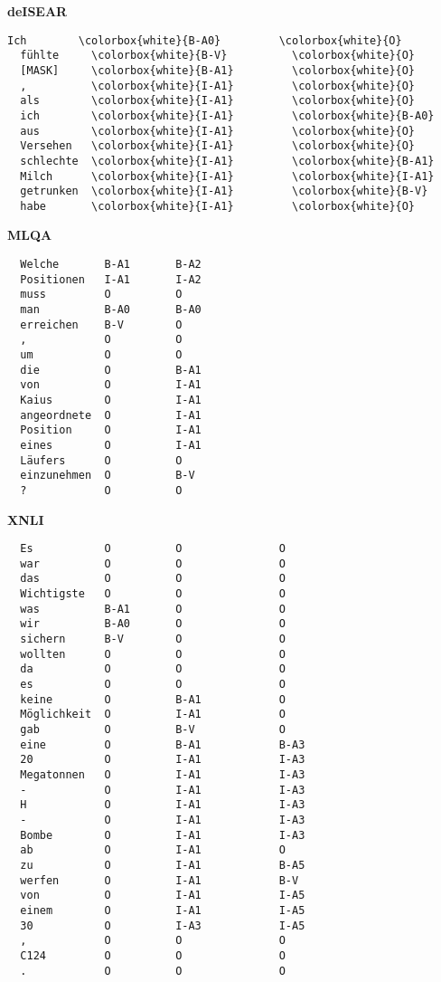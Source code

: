 \textbf{deISEAR}

\begin{Verbatim}[commandchars=\\\{\}]
  Ich        \colorbox{white}{B-A0}         \colorbox{white}{O}
  fühlte     \colorbox{white}{B-V}          \colorbox{white}{O}
  [MASK]     \colorbox{white}{B-A1}         \colorbox{white}{O}
  ,          \colorbox{white}{I-A1}         \colorbox{white}{O}
  als        \colorbox{white}{I-A1}         \colorbox{white}{O}
  ich        \colorbox{white}{I-A1}         \colorbox{white}{B-A0}
  aus        \colorbox{white}{I-A1}         \colorbox{white}{O}
  Versehen   \colorbox{white}{I-A1}         \colorbox{white}{O}
  schlechte  \colorbox{white}{I-A1}         \colorbox{white}{B-A1}
  Milch      \colorbox{white}{I-A1}         \colorbox{white}{I-A1}
  getrunken  \colorbox{white}{I-A1}         \colorbox{white}{B-V}
  habe       \colorbox{white}{I-A1}         \colorbox{white}{O}
\end{Verbatim}

\textbf{MLQA}

\begin{verbatim}
  Welche       B-A1       B-A2
  Positionen   I-A1       I-A2
  muss         O          O
  man          B-A0       B-A0
  erreichen    B-V        O
  ,            O          O
  um           O          O
  die          O          B-A1
  von          O          I-A1
  Kaius        O          I-A1
  angeordnete  O          I-A1
  Position     O          I-A1
  eines        O          I-A1
  Läufers      O          O
  einzunehmen  O          B-V
  ?            O          O
\end{verbatim}

\textbf{XNLI}

\begin{verbatim}
  Es           O          O               O
  war          O          O               O
  das          O          O               O
  Wichtigste   O          O               O
  was          B-A1       O               O
  wir          B-A0       O               O
  sichern      B-V        O               O
  wollten      O          O               O
  da           O          O               O
  es           O          O               O
  keine        O          B-A1            O
  Möglichkeit  O          I-A1            O
  gab          O          B-V             O
  eine         O          B-A1            B-A3
  20           O          I-A1            I-A3
  Megatonnen   O          I-A1            I-A3
  -            O          I-A1            I-A3
  H            O          I-A1            I-A3
  -            O          I-A1            I-A3
  Bombe        O          I-A1            I-A3
  ab           O          I-A1            O
  zu           O          I-A1            B-A5
  werfen       O          I-A1            B-V
  von          O          I-A1            I-A5
  einem        O          I-A1            I-A5
  30           O          I-A3            I-A5
  ,            O          O               O
  C124         O          O               O
  .            O          O               O
\end{verbatim}

